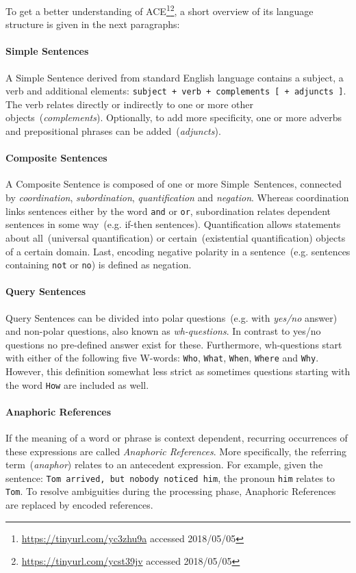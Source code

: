 To get a better understanding of ACE\footnote{\url{https://tinyurl.com/yc3zhu9a} accessed 2018/05/05}\footnote{\url{https://tinyurl.com/ycst39jv} accessed 2018/05/05}, a short overview of its language structure is given in the next paragraphs:
 
\paragraph{Simple Sentences} A Simple Sentence derived from standard English language contains a subject, a verb and additional elements: \texttt{subject + verb + complements~[~+~adjuncts~]}. The verb relates directly or indirectly to one or more other objects~(\textit{complements}). Optionally, to add more specificity, one or more adverbs and prepositional phrases can be added~(\textit{adjuncts}). 

\paragraph{Composite Sentences} A Composite Sentence is composed of one or more Simple~Sentences, connected by \textit{coordination},
\textit{subordination}, \textit{quantification} and \textit{negation}. Whereas coordination links sentences either by the word \texttt{and} or \texttt{or}, subordination relates dependent sentences in some way~(e.g. if-then sentences). Quantification allows statements about all~(universal quantification) or certain~(existential quantification) objects of a certain domain. Last, encoding negative polarity in a sentence~(e.g. sentences containing \texttt{not} or \texttt{no}) is defined as negation. 

\paragraph{Query Sentences} Query Sentences can be divided into polar questions~(e.g. with \textit{yes/no} answer) and non-polar questions, also known as \emph{wh-questions}. In contrast to yes/no questions no pre-defined answer exist for these. Furthermore, wh-questions start with either of the following five W-words: \texttt{Who}, \texttt{What}, \texttt{When}, \texttt{Where} and \texttt{Why}. However, this definition somewhat less strict as sometimes questions starting with the word \texttt{How} are included as well.

\paragraph{Anaphoric References} If the meaning of a word or phrase is context dependent, recurring occurrences of these expressions are called \textit{Anaphoric References}. More specifically, the referring term~(\textit{anaphor}) relates to an antecedent expression. For example, given the sentence: \texttt{Tom arrived, but nobody noticed him}, the pronoun \texttt{him} relates to \texttt{Tom}. To resolve ambiguities during the processing phase, Anaphoric References are replaced by encoded references. 

